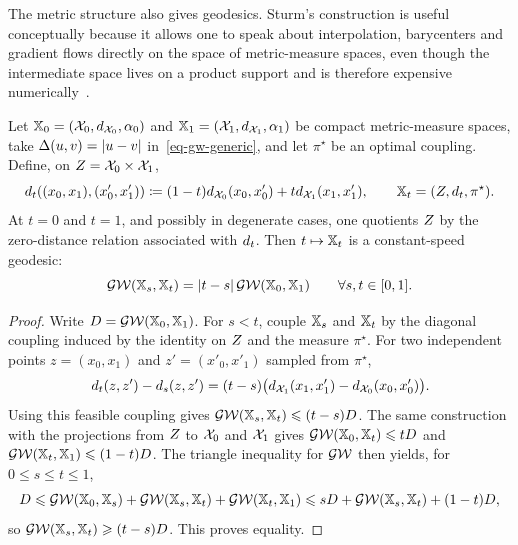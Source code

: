 The metric structure also gives geodesics. Sturm's construction is useful conceptually because it allows one to speak about interpolation, barycenters and gradient flows directly on the space of metric-measure spaces, even though the intermediate space lives on a product support and is therefore expensive numerically~\cite{SturmGW}.

\begin{prop}\label{prop-gw-geodesics}
	Let $\mathbb{X}_0=(\mathcal{X}_0,d_{\mathcal{X}_0},\alpha_0)$ and $\mathbb{X}_1=(\mathcal{X}_1,d_{\mathcal{X}_1},\alpha_1)$ be compact metric-measure spaces, take $\Delta(u,v)=|u-v|$ in~\eqref{eq-gw-generic}, and let $\pi^\star$ be an optimal coupling. Define, on $Z=\mathcal{X}_0\times\mathcal{X}_1$,
	\[
		d_t((x_0,x_1),(x'_0,x'_1))
		\coloneqq
		(1-t)d_{\mathcal{X}_0}(x_0,x'_0)+td_{\mathcal{X}_1}(x_1,x'_1),
		\qquad
		\mathbb{X}_t=(Z,d_t,\pi^\star).
	\]
	At $t=0$ and $t=1$, and possibly in degenerate cases, one quotients $Z$ by the zero-distance relation associated with $d_t$. Then $t\mapsto\mathbb{X}_t$ is a constant-speed geodesic:
	\[
		\operatorname{\mathcal{GW}}(\mathbb{X}_s,\mathbb{X}_t)=|t-s|\operatorname{\mathcal{GW}}(\mathbb{X}_0,\mathbb{X}_1)
		\qquad
		\forall s,t\in[0,1].
	\]
\end{prop}

\begin{proof}
	Write $D=\operatorname{\mathcal{GW}}(\mathbb{X}_0,\mathbb{X}_1)$. For $s<t$, couple $\mathbb{X}_s$ and $\mathbb{X}_t$ by the diagonal coupling induced by the identity on $Z$ and the measure $\pi^\star$. For two independent points $z=(x_0,x_1)$ and $z'=(x'_0,x'_1)$ sampled from $\pi^\star$,
	\[
		d_t(z,z')-d_s(z,z')
		=
		(t-s)\big(d_{\mathcal{X}_1}(x_1,x'_1)-d_{\mathcal{X}_0}(x_0,x'_0)\big).
	\]
	Using this feasible coupling gives $\operatorname{\mathcal{GW}}(\mathbb{X}_s,\mathbb{X}_t)\leqslant(t-s)D$. The same construction with the projections from $Z$ to $\mathcal{X}_0$ and $\mathcal{X}_1$ gives $\operatorname{\mathcal{GW}}(\mathbb{X}_0,\mathbb{X}_t)\leqslant tD$ and $\operatorname{\mathcal{GW}}(\mathbb{X}_t,\mathbb{X}_1)\leqslant(1-t)D$. The triangle inequality for $\operatorname{\mathcal{GW}}$ then yields, for $0\leq s\leq t\leq1$,
	\[
		D
		\leqslant
		\operatorname{\mathcal{GW}}(\mathbb{X}_0,\mathbb{X}_s)+\operatorname{\mathcal{GW}}(\mathbb{X}_s,\mathbb{X}_t)+\operatorname{\mathcal{GW}}(\mathbb{X}_t,\mathbb{X}_1)
		\leqslant
		sD+\operatorname{\mathcal{GW}}(\mathbb{X}_s,\mathbb{X}_t)+(1-t)D,
	\]
	so $\operatorname{\mathcal{GW}}(\mathbb{X}_s,\mathbb{X}_t)\geqslant(t-s)D$. This proves equality.
\end{proof}

